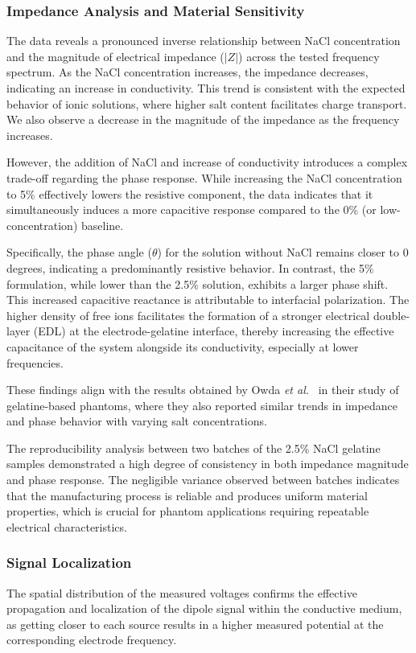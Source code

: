 \subsubsection{Impedance Analysis and Material Sensitivity}

The data reveals a pronounced inverse relationship between NaCl concentration and the magnitude of electrical impedance ($|Z|$) across the tested frequency spectrum. As the NaCl concentration increases, the impedance decreases, indicating an increase in conductivity. This trend is consistent with the expected behavior of ionic solutions, where higher salt content facilitates charge transport. We also observe a decrease in the magnitude of the impedance as the frequency increases. 

However, the addition of NaCl and increase of conductivity introduces a complex trade-off regarding the phase response. While increasing the NaCl concentration to 5\% effectively lowers the resistive component, the data indicates that it simultaneously induces a more capacitive response compared to the 0\% (or low-concentration) baseline.

Specifically, the phase angle ($\theta$) for the solution without NaCl remains closer to 0 degrees, indicating a predominantly resistive behavior. In contrast, the 5\% formulation, while lower than the 2.5\% solution, exhibits a larger phase shift. This increased capacitive reactance is attributable to interfacial polarization. The higher density of free ions facilitates the formation of a stronger electrical double-layer (EDL) at the electrode-gelatine interface, thereby increasing the effective capacitance of the system alongside its conductivity, especially at lower frequencies.

These findings align with the results obtained by Owda \emph{et al.}~\cite{Owda2020} in their study of gelatine-based phantoms, where they also reported similar trends in impedance and phase behavior with varying salt concentrations.

The reproducibility analysis between two batches of the 2.5\% NaCl gelatine samples demonstrated a high degree of consistency in both impedance magnitude and phase response. The negligible variance observed between batches indicates that the manufacturing process is reliable and produces uniform material properties, which is crucial for phantom applications requiring repeatable electrical characteristics.

\subsubsection{Signal Localization}

The spatial distribution of the measured voltages confirms the effective propagation and localization of the dipole signal within the conductive medium, as getting closer to each source results in a higher measured potential at the corresponding electrode frequency.
